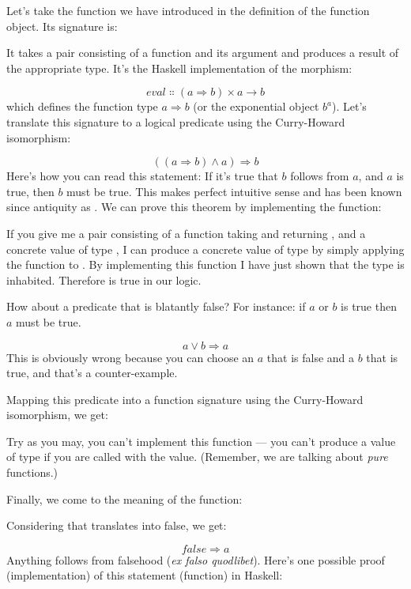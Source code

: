 Let's take the function  we have introduced in the
definition of the function object. Its signature is:

It takes a pair consisting of a function and its argument and produces a
result of the appropriate type. It's the Haskell implementation of the
morphism:

\[eval \Colon (a \Rightarrow b) \times a \to b\]
which defines the function type $a \Rightarrow b$ (or the exponential object
$b^{a}$). Let's translate this signature to a logical predicate
using the Curry-Howard isomorphism:

\[((a \Rightarrow b) \wedge a) \Rightarrow b\]
Here's how you can read this statement: If it's true that $b$
follows from $a$, and $a$ is true, then $b$ must be
true. This makes perfect intuitive sense and has been known since
antiquity as . We can prove this theorem by
implementing the function:

If you give me a pair consisting of a function  taking
 and returning , and a concrete value  of
type , I can produce a concrete value of type  by
simply applying the function  to . By implementing
this function I have just shown that the type
 is inhabited.
Therefore  is true in our logic.

How about a predicate that is blatantly false? For instance: if
$a$ or $b$ is true then $a$ must be true.

\[a \vee b \Rightarrow a\]
This is obviously wrong because you can choose an $a$ that is
false and a $b$ that is true, and that's a counter-example.

Mapping this predicate into a function signature using the Curry-Howard
isomorphism, we get:

Try as you may, you can't implement this function --- you can't produce
a value of type  if you are called with the 
value. (Remember, we are talking about \emph{pure} functions.)

Finally, we come to the meaning of the  function:

Considering that  translates into false, we get:

\[false \Rightarrow a\]
Anything follows from falsehood (\emph{ex falso quodlibet}). Here's one
possible proof (implementation) of this statement (function) in Haskell:

